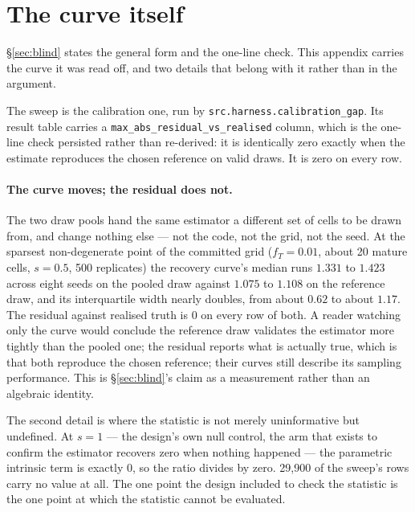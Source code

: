 \appendix

\section{The curve itself}
\label{app:generator}

\S\ref{sec:blind} states the general form and the one-line check. This appendix
carries the curve it was read off, and two details that belong with it rather
than in the argument.

The sweep is the calibration one, run by
\texttt{src.harness.calibration\_gap}. Its result table carries a
\texttt{max\_abs\_residual\_vs\_realised} column, which is the one-line check
persisted rather than re-derived: it is identically zero exactly when the estimate reproduces the chosen reference on valid draws. It is zero on every row.

\paragraph{The curve moves; the residual does not.} The two draw pools hand the
same estimator a different set of cells to be drawn from, and change nothing
else --- not the code, not the grid, not the seed. At the sparsest
non-degenerate point of the committed grid ($f_T = 0.01$, about 20 mature cells,
$s = 0.5$, 500 replicates) the recovery curve's median runs $1.331$ to $1.423$ across eight
seeds on the pooled draw against $1.075$ to $1.108$ on the reference draw, and
its interquartile width nearly doubles, from about $0.62$ to about $1.17$. The
residual against realised truth is $0$ on every row of both. A reader watching
only the curve would conclude the reference draw validates the estimator more
tightly than the pooled one; the residual reports what is actually true, which
is that both reproduce the chosen reference; their curves still describe its sampling
performance. This is
\S\ref{sec:blind}'s claim as a measurement rather than an algebraic identity.

The second detail is where the statistic is not merely uninformative but
undefined. At $s = 1$ --- the design's own null control, the arm that exists to
confirm the estimator recovers zero when nothing happened --- the parametric
intrinsic term is exactly $0$, so the ratio divides by zero. 29{,}900 of the
sweep's rows carry no value at all. The one point the design included to check
the statistic is the one point at which the statistic cannot be evaluated.

